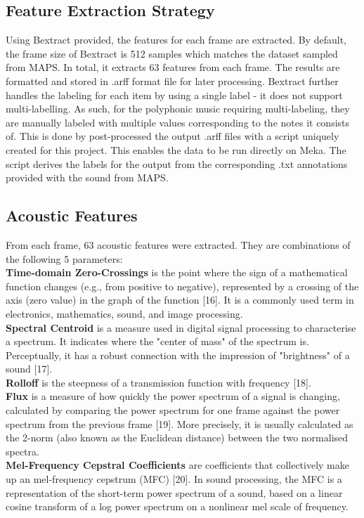 \documentclass{article}
\begin{document}
\subsection{Feature Extraction Strategy}
Using Bextract provided, the features for each frame are extracted. By default, the frame size of Bextract is 512 samples which matches the dataset sampled from MAPS. In total, it extracts 63 features from each frame. The results are formatted and stored in .arff format file for later processing. Bextract further handles the labeling for each item by using a single label - it does not support multi-labelling. As such, for the polyphonic music requiring multi-labeling, they are manually labeled with multiple values corresponding to the notes it consists of. This is done by post-processed the output .arff files with a script uniquely created for this project. This enables the data to be run directly on Meka. The script derives the labels for the output from the corresponding .txt annotations provided with the sound from MAPS. 
\subsection{Acoustic Features}
From each frame, 63 acoustic features were extracted. They are combinations of the following 5 parameters:\\
\textbf{Time-domain Zero-Crossings}  is the point where the sign of a mathematical function changes (e.g.,  from positive to negative), represented by a crossing of the axis (zero value) in the graph of the function [16]. It is a commonly used term in electronics, mathematics, sound, and image processing.\\
\textbf{Spectral Centroid} is a measure used in digital signal processing to characterise a spectrum. It indicates where the "center of mass" of the spectrum is. Perceptually, it has a robust connection with the impression of "brightness" of a sound [17].\\
\textbf{Rolloff} is the steepness of a transmission function with frequency [18].\\
\textbf{Flux} is a measure of how quickly the power spectrum of a signal is changing, calculated by comparing the power spectrum for one frame against the power spectrum from the previous frame [19]. More precisely, it is usually calculated as the 2-norm (also known as the Euclidean distance) between the two normalised spectra.\\
\textbf{Mel-Frequency Cepstral Coefficients} are coefficients that collectively make up an  mel-frequency cepstrum (MFC) [20]. In sound processing, the MFC is a representation of the short-term power spectrum of a sound, based on a linear cosine transform of a log power spectrum on a nonlinear mel scale of frequency.
\end{document}
